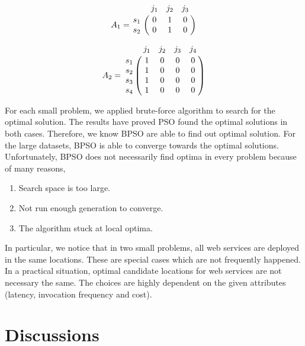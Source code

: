 \parbox{.5\linewidth}{

$$
A_1 = \bbordermatrix{~ & j_{1} & j_{2} & j_{3}\cr
					s_{1}	&0 &1 &0	\cr
					s_{2}	&0  &1 &0	\cr}
$$
}
\parbox{.5\linewidth}{

$$
A_2 = \bbordermatrix{~ & j_{1} & j_{2} & j_{3} & j_{4}\cr
					s_{1}	&1 &0 &0 &0	\cr
					s_{2}	&1  &0 &0 &0	\cr
					s_{3}	&1 &0 &0 &0	\cr
					s_{4}	&1 &0 &0 &0	\cr}
$$
}
For each small problem, we applied brute-force algorithm to search for the optimal solution.  
The results have proved PSO found the optimal solutions in both cases.
Therefore, we know BPSO are able to find out optimal solution. For the large datasets, BPSO is able to converge towards the optimal solutions. Unfortunately,
BPSO does not necessarily find optima in every problem because of many reasons,
\begin{enumerate}
	\item Search space is too large.
	\item Not run enough generation to converge.
	\item The algorithm stuck at local optima.
\end{enumerate}

In particular, we notice that in two small problems, all web services are deployed in the same locations. These are special cases which are not frequently
happened. In a practical situation, optimal candidate locations for web services are not necessary the same. 
The choices are highly dependent on the given attributes (latency, invocation frequency and cost).


\section{Discussions}
% 

